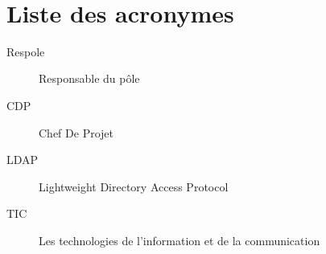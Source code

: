 ﻿﻿\chapter*{Liste des acronymes}

\begin{description}
\item[Respole] Responsable du pôle
\item[CDP] Chef De Projet 
\item[LDAP] Lightweight Directory Access Protocol
\item[TIC] Les technologies de l'information et de la communication

\end{description}
